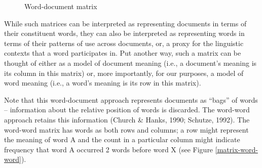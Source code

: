 \documentclass[man,floatsintext]{apa6}
\begin{document}
\begin{figure}
  \begin{center}
    \footnotesize{}
  \end{center}
  \caption{Word-document matrix}
  \label{matrix-word-doc}
\end{figure}

While such matrices can be interpreted as representing documents in terms of their constituent words, they can also be interpreted as representing words in terms of their patterns of use across documents, or, a proxy for the linguistic contexts that a word participates in. Put another way, such a matrix can be thought of either as a model of document meaning (i.e., a document's meaning is its column in this matrix) or, more importantly, for our purposes, a model of word meaning (i.e., a word's meaning is its row in this matrix).

Note that this word-document approach represents documents as ``bags'' of words -- information about the relative position of words is discarded. The word-word approach retains this information (Church \& Hanks, 1990; Schutze, 1992). The word-word matrix has words as both rows and columns; a row might represent the meaning of word A and the count in a particular column might indicate frequency that word A occurred 2 words before word X (see Figure \ref{matrix-word-word}).
\end{document}
